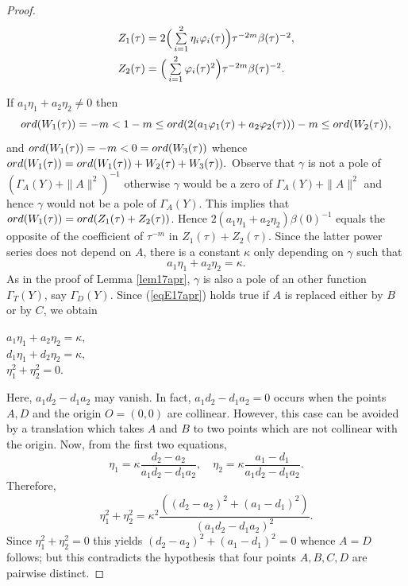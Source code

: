 \documentclass[10pt,a4paper]{amsart}
\begin{document}
\begin{proof}
\[
\begin{array}{l}
Z_1(\tau)=2\Big(\sum\limits_{i=1}^2 \eta_i\varphi_i(\tau)\Big)\tau^{-2m}\beta(\tau)^{-2},\vspace{0.1cm}\\ 
Z_2(\tau)=\Big(\sum\limits_{i=1}^2\varphi_i(\tau)^2\Big)\tau^{-2m}\beta(\tau)^{-2}.
\end{array}
\]

If $a_1\eta_1+a_2\eta_2\neq 0$ then
$${\rm{ord}}(W_1(\tau))=-m<1-m\le{\rm{ord}}(2(a_1\varphi_1(\tau)+a_2\varphi_2(\tau)))-m\leq {\rm{ord}}(W_2(\tau)),$$ and ${\rm{ord}}(W_1(\tau))=-m<0={\rm{ord}}(W_3(\tau))$ whence ${\rm{ord}}(W_1(\tau))={\rm{ord}}(W_1(\tau))+W_2(\tau)+W_3(\tau)).$  Observe that $\gamma$ is not a pole of $(\Gamma_A(Y)+\|A\|^2)^{-1}$
otherwise $\gamma$ would be a zero of $\Gamma_A(Y)+\|A\|^2$ and hence $\gamma$ would not be a pole of $\Gamma_A(Y)$.
This implies that ${\rm{ord}}(W_1(\tau))={\rm{ord}}(Z_1(\tau)+Z_2(\tau))$. Hence
$2(a_1\eta_1+a_2\eta_2)\beta(0)^{-1}$ equals the opposite of the coefficient of $\tau^{-m}$ in $Z_1(\tau)+Z_2(\tau)$. Since the latter power series does not depend on $A$, there is a constant $\kappa$ only depending on $\gamma$ such that
\begin{equation}
\label{eqE17apr} a_1\eta_1+a_2\eta_2=\kappa.
\end{equation}
As in the proof of Lemma \ref{lem17apr}, $\gamma$ is also a pole of an other function $\Gamma_T(Y)$, say $\Gamma_D(Y)$. Since (\ref{eqE17apr}) holds true if $A$ is replaced either by $B$ or by $C$, we obtain

\begin{center}
$a_1\eta_1+a_2\eta_2=\kappa,$\\
$d_1\eta_1+d_2\eta_2=\kappa,$\\
$\eta_1^2+\eta_2^2=0.$
\end{center}

Here, $a_1d_2-d_1a_2$ may vanish. In fact, $a_1d_2-d_1a_2=0$ occurs when the points $A,D$ and the origin $O=(0,0)$ are collinear. However, this case can be avoided by a translation which takes $A$ and $B$ to two points which are not collinear with the origin.  Now, from the first two equations,
$$\eta_1=\kappa \frac{d_2-a_2}{a_1d_2-d_1a_2},\quad \eta_2=\kappa \frac{a_1-d_1}{a_1d_2-d_1a_2}.$$
Therefore,
\[
\eta_1^2+\eta_2^2=\kappa^2\frac{{((d_2-a_2)^2+(a_1-d_1)^2)}}{{(a_1d_2-d_1a_2)^2}}.
\]
Since $\eta_1^2+\eta_2^2=0$ this yields $(d_2-a_2)^2+(a_1-d_1)^2=0$ whence $A=D$ follows; but this contradicts the hypothesis that four points $A,B,C,D$ are pairwise distinct.
\end{proof}
\end{document}
